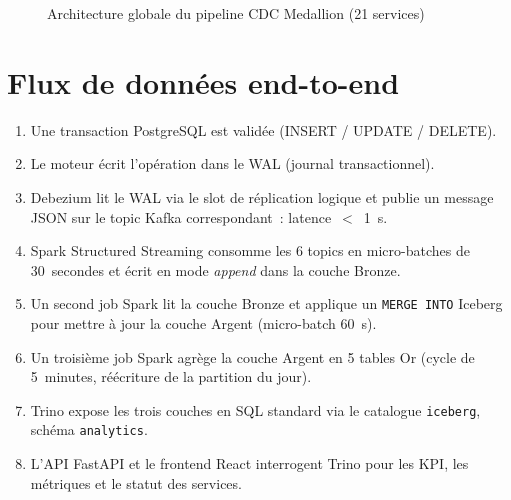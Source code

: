 \documentclass[12pt,a4paper]{report}
\begin{document}
\begin{figure}[h]
\caption{Architecture globale du pipeline CDC Medallion (21 services)}
\label{fig:archi}
\end{figure}

\section{Flux de données end-to-end}

\begin{enumerate}
    \item Une transaction PostgreSQL est validée (INSERT / UPDATE / DELETE).
    \item Le moteur écrit l'opération dans le WAL (journal transactionnel).
    \item Debezium lit le WAL via le slot de réplication logique et publie
          un message JSON sur le topic Kafka correspondant~: latence~$<$~1~s.
    \item Spark Structured Streaming consomme les 6 topics en micro-batches
          de 30~secondes et écrit en mode \emph{append} dans la couche Bronze.
    \item Un second job Spark lit la couche Bronze et applique un
          \texttt{MERGE INTO} Iceberg pour mettre à jour la couche Argent
          (micro-batch 60~s).
    \item Un troisième job Spark agrège la couche Argent en 5 tables Or
          (cycle de 5~minutes, réécriture de la partition du jour).
    \item Trino expose les trois couches en SQL standard via le catalogue
          \texttt{iceberg}, schéma \texttt{analytics}.
    \item L'API FastAPI et le frontend React interrogent Trino pour
          les KPI, les métriques et le statut des services.
\end{enumerate}
\end{document}
